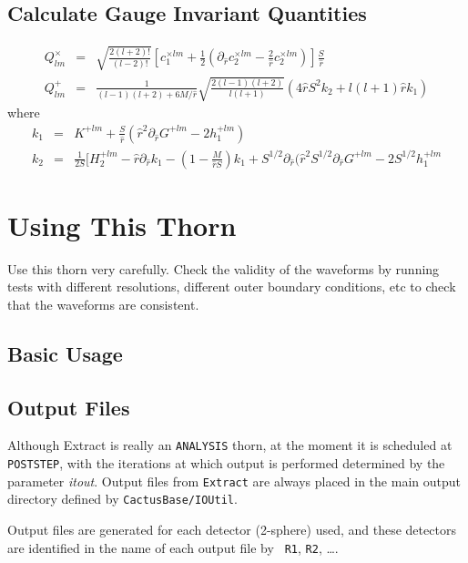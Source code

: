 \documentclass{article}
\begin{document}
\subsection{Calculate Gauge Invariant Quantities}

\begin{eqnarray}
Q^{\times}_{lm} 
  & = & \sqrt{\frac{2(l+2)!}{(l-2)!}}\left[c_1^{\times lm}
        + \frac{1}{2}\left(\partial_{\hat{r}} c_2^{\times lm} - \frac{2}{\hat{r}}
        c_2^{\times lm}\right)\right] \frac{S}{\hat{r}}
\\
Q^{+}_{lm}
  & = & \frac{1}{(l-1)(l+2)+6M/\hat{r}}\sqrt{\frac{2(l-1)(l+2)}{l(l+1)}}
        (4\hat{r}S^2 k_2+l(l+1)\hat{r} k_1) 
\end{eqnarray}
where
\begin{eqnarray}
k_1 & = & K^{+lm} + \frac{S}{\hat{r}}(\hat{r}^2\partial_{\hat{r}} G^{+lm} - 2h^{+lm}_1) \\
k_2 & = & \frac{1}{2S}
          [H^{+lm}_2-\hat{r}\partial_{\hat{r}} k_1-(1-\frac{M}{\hat{r}S}) k_1 + S^{1/2}\partial_{\hat{r}}
          (\hat{r}^2 S^{1/2} \partial_{\hat{r}} G^{+lm}-2S^{1/2}h_1^{+lm}
\end{eqnarray}

\section{Using This Thorn}

Use this thorn very carefully. Check the validity of the waveforms by running
tests with different resolutions, different outer boundary conditions, etc
to check that the waveforms are consistent.

\subsection{Basic Usage}

\subsection{Output Files}

Although Extract is really an {\tt ANALYSIS} thorn, at the moment it
is scheduled at {\tt POSTSTEP}, with the iterations at which output is
performed determined by the parameter {\it itout}. Output files from
{\tt Extract} are always placed in the main output directory defined
by {\tt CactusBase/IOUtil}.

Output files are generated for each detector (2-sphere) used, and
these detectors are identified in the name of each output file by {\tt
R1}, {\tt R2}, \ldots.
\end{document}
